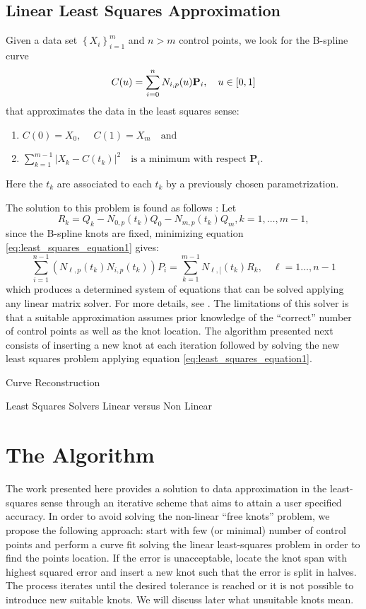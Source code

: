 \subsection{Linear Least Squares Approximation}
Given a data set $\left\{X_i\right\}_{i=1}^m$ and $n>m$ control points, 
we look for the B-spline curve 
\begin{equation}
 C(u) = \sum_{i=0}^n N_{i,p}(u) \textbf P_i,\quad u\in[0,1]
\end{equation}\label{eq:least_squares_equation1}
that approximates the data in the least squares sense:
\begin{enumerate}
 \item $ C(0)= X_0, \quad \  C(1) = X_m\quad \text{and}$
 \item $\sum _{k= 1}^{m-1}\left | X_k - C(t_k)\right|^2\quad \text{is a minimum with respect }\mathbf P_i.$
\end{enumerate}
Here the $t_k$ are associated to each $t_k$ by a previously chosen parametrization. 

The solution to this problem is found as follows \cite[Ch. 9.4.1]{nurbs_book}:
Let 
$$
 R_k = Q_k - N_{0,p}(t_k)Q_0 - N_{m,p}(t_k)Q_m,  k = 1,\ldots, m-1, 
$$
since the B-spline knots are fixed, minimizing equation \eqref{eq:least_squares_equation1} gives:
\begin{equation}\label{eq:linear_least_squares_solver}
 \sum_{i=1}^{n-1} \left(N_{\ell, p}(t_k)N_{i,p}(t_k)\right)P_i= \sum_{k=1}^{m-1}N_{\ell,[}(t_k)R_k, \quad \ell= 1\ldots, n-1
\end{equation}
 which produces a determined system of equations that can be solved applying any linear matrix solver. For more details, see \cite{nurbs_book}.
The limitations of this solver is that a suitable approximation assumes prior knowledge of the ``correct'' number of control points as well as the knot 
location. The algorithm presented next consists of inserting a new knot at 
each iteration followed by solving the new least squares problem applying equation \eqref{eq:least_squares_equation1}. 


Curve Reconstruction
 
 Least Squares Solvers
 Linear versus Non Linear
 
 
 \section{The Algorithm}
 
 The work presented here provides a solution to data approximation in the least-squares sense through an iterative 
 scheme that aims to attain a user specified accuracy. 
In order to avoid solving the non-linear ``free knots'' problem, we propose the following approach: start with few (or minimal) number of control points and perform a curve fit solving the linear least-squares problem in order to find 
the points location. If the error is unacceptable, locate the knot span with highest squared error and insert a  new knot such that the error is split in halves. The process iterates until the desired tolerance is reached or it is not 
possible to introduce new suitable knots. We will discuss later what unsuitable knots mean. 

